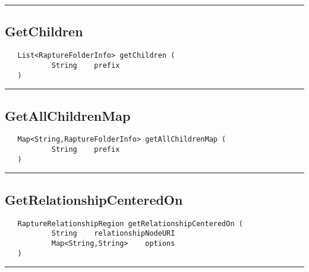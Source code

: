\rule{15cm}{2pt}
\subsection{GetChildren}
\label{Api:GetChildren}
\begin{verbatim}
   List<RaptureFolderInfo> getChildren (
           String    prefix
   )
\end{verbatim}



\rule{15cm}{2pt}
\subsection{GetAllChildrenMap}
\label{Api:GetAllChildrenMap}
\begin{verbatim}
   Map<String,RaptureFolderInfo> getAllChildrenMap (
           String    prefix
   )
\end{verbatim}



\rule{15cm}{2pt}
\subsection{GetRelationshipCenteredOn}
\label{Api:GetRelationshipCenteredOn}
\begin{verbatim}
   RaptureRelationshipRegion getRelationshipCenteredOn (
           String    relationshipNodeURI
           Map<String,String>    options
   )
\end{verbatim}



\rule{15cm}{2pt}
